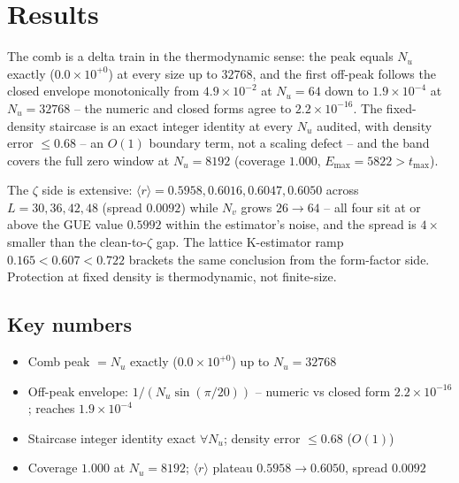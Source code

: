 \documentclass[11pt,a4paper]{article}
\begin{document}
\section{Results}
The comb is a delta train in the thermodynamic sense: the peak equals $N_u$ exactly ($0.0\times10^{+0}$) at every size up to $32768$, and the first off-peak follows the closed envelope monotonically from $4.9\times10^{-2}$ at $N_u = 64$ down to $1.9\times10^{-4}$ at $N_u = 32768$ -- the numeric and closed forms agree to $2.2\times10^{-16}$. The fixed-density staircase is an exact integer identity at every $N_u$ audited, with density error $\le 0.68$ -- an $O(1)$ boundary term, not a scaling defect -- and the band covers the full zero window at $N_u = 8192$ (coverage $1.000$, $E_{\max} = 5822 > t_{\max}$).

The $\zeta$ side is extensive: $\langle r\rangle = 0.5958, 0.6016, 0.6047, 0.6050$ across $L = 30, 36, 42, 48$ (spread $0.0092$) while $N_v$ grows $26 \to 64$ -- all four sit at or above the GUE value $0.5992$ within the estimator's noise, and the spread is $4\times$ smaller than the clean-to-$\zeta$ gap. The lattice K-estimator ramp $0.165 < 0.607 < 0.722$ brackets the same conclusion from the form-factor side. Protection at fixed density is thermodynamic, not finite-size.

\subsection{Key numbers}
\begin{tcolorbox}[colback=labblue!6, colframe=labblue!70!black, boxrule=0.6pt, title={Key results (canonical run)}]
\begin{itemize}[leftmargin=1.2em, itemsep=0.15em]
\item Comb peak $= N_u$ exactly ($0.0\times10^{+0}$) up to $N_u = 32768$
\item Off-peak envelope: $1/(N_u\sin(\pi/20))$ -- numeric vs closed form $2.2\times10^{-16}$; reaches $1.9\times10^{-4}$
\item Staircase integer identity exact $\forall N_u$; density error $\le 0.68$ ($O(1)$)
\item Coverage $1.000$ at $N_u = 8192$; $\langle r\rangle$ plateau $0.5958 \to 0.6050$, spread $0.0092$
\end{itemize}
\end{tcolorbox}
\end{document}
